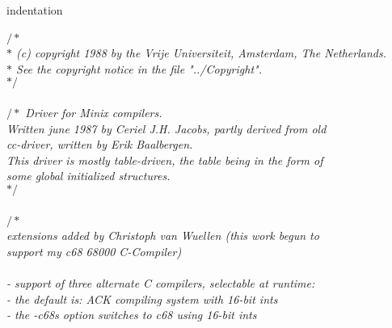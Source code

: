 %
%
\expandafter\ifx\csname indentation\endcsname\relax
\newlength{\indentation}\fi
\setlength{\indentation}{0.5em}
\begin{flushleft}
{$/\ast$\it{}\mbox{}\\
\hspace*{1\indentation}$\ast$ (c) copyright 1988 by the Vrije Universiteit, Amsterdam, The Netherlands.\mbox{}\\
\hspace*{1\indentation}$\ast$ See the copyright notice in the file "../Copyright".\mbox{}\\
\hspace*{1\indentation}$\ast/$}\mbox{}\\
\mbox{}\\
{$/\ast$\it{} Driver for Minix compilers.\mbox{}\\
\hspace*{3\indentation}Written june 1987 by Ceriel J.H. Jacobs, partly derived from old\mbox{}\\
\hspace*{3\indentation}cc-driver, written by Erik Baalbergen.\mbox{}\\
\hspace*{3\indentation}This driver is mostly table-driven, the table being in the form of\mbox{}\\
\hspace*{3\indentation}some global initialized structures.\mbox{}\\
$\ast/$}\mbox{}\\
\mbox{}\\
{$/\ast$\it{}\mbox{}\\
\hspace*{8\indentation}extensions added by Christoph van Wuellen (this work begun to\mbox{}\\
\hspace*{8\indentation}support my c68 68000 C-Compiler)\mbox{}\\
\hspace*{8\indentation}\mbox{}\\
\hspace*{8\indentation}- support of three alternate C compilers, selectable at runtime:\mbox{}\\
\hspace*{7\indentation}- the default is: ACK compiling system with 16-bit ints\mbox{}\\
\hspace*{7\indentation}- the -c68s option switches to c68 using 16-bit ints\mbox{}\\
}
\end{flushleft}
